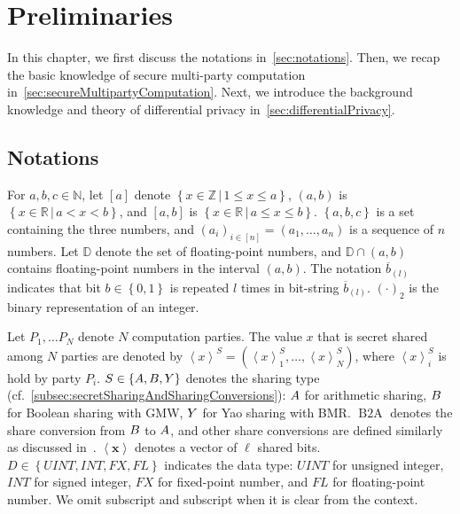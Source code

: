 \chapter{Preliminaries}
\label{cha:prelim}

In this chapter, we first discuss the notations in~\autoref{sec:notations}. Then, we recap the basic knowledge of secure multi-party computation in~\autoref{sec:secureMultipartyComputation}. Next, we introduce the background knowledge and theory of differential privacy in~\autoref{sec:differentialPrivacy}.

\section{Notations}
\label{sec:notations}


For $a,b,c \in \mathbb{N} $, let $\left[a\right] $ denote $\left\{x\in \mathbb{Z} \,|\, 1 \leq x \leq a\right\} $, $\left(a,b\right) $ is $\left\{x\in \mathbb{R} \, | \, a<x< b\right\} $, and $\left[a,b\right] $ is $\left\{x\in \mathbb{R} \, | \,a\leq x\leq b\right\} $. $\left\{a,b,c\right\} $ is a set containing the three numbers, and $\left(a_i\right)_{i \in \left[ n\right]}=\left(a_1,\ldots,a_n\right) $ is a sequence of $n$ numbers.
Let $\mathbb{D}$ denote the set of floating-point numbers, and $\mathbb{D} \cap \left(a,b\right) $ contains floating-point numbers in the interval $\left(a,b\right)$. The notation $\overline{b}_{\left(l\right) }$ indicates that bit $b\in \left\{0,1\right\} $ is repeated $l$ times in bit-string $\overline{b}_{\left(l\right) }$. $\left(\cdot\right)_2 $ is the binary representation of an integer.

Let $P_1, \ldots P_{N} $ denote $N$ computation parties. The value $x$ that is secret shared among $N$ parties are denoted by $\left\langle x\right\rangle ^S=\left(\left\langle x\right\rangle_1^S ,\ldots, \left\langle x\right\rangle_N^S\right) $, where
$\left\langle x\right\rangle _i^S$ is hold by party $P_i$.
$S \in \left\{A,B,Y\right\} $ denotes the sharing type (cf.~\autoref{subsec:secretSharingAndSharingConversions}): $A$ for arithmetic sharing, $B$ for Boolean sharing with GMW, $Y$ for Yao sharing with BMR. $\operatorname{B2A}$ denotes the share conversion from $B$ to $A$, and other share conversions are defined similarly as discussed in~\cite{DSZ15}.
$\left\langle \boldsymbol{x}\right\rangle $ denotes a vector of $\ell$ shared bits.
$D \in \left\{UINT,INT,FX,FL\right\} $ indicates the data type: $UINT$ for unsigned integer, $INT$ for signed integer, $FX$ for fixed-point number, and $FL$ for floating-point number. We omit subscript and subscript when it is clear from the context.

